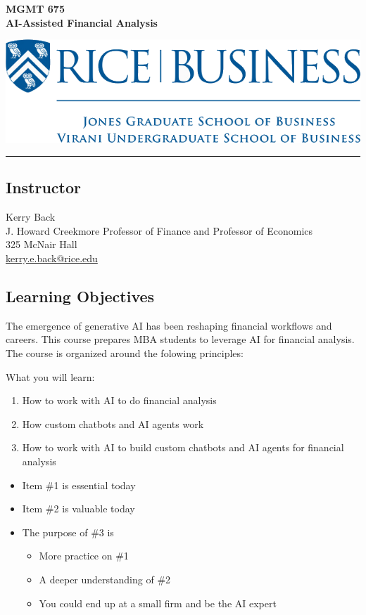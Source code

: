 \documentclass[11pt]{article}
\begin{document}
\begin{minipage}[c][3cm][c]{0.5\textwidth}
\Large\textbf{MGMT 675\\ AI-Assisted Financial Analysis}
\end{minipage}
\hfill
\begin{minipage}[c][3cm][c]{0.4\textwidth}
\includegraphics[width=\textwidth]{rice-business-transparent-final.png}
\end{minipage}

\vspace{0.5cm}
\hrule

\subsection*{Instructor}
Kerry Back\\
J. Howard Creekmore Professor of Finance and Professor of Economics\\
325 McNair Hall\\
\href{mailto:kerry.e.back@rice.edu}{kerry.e.back@rice.edu}

\subsection*{Learning Objectives}

The emergence of generative AI has been reshaping financial workflows and careers. This course prepares MBA students to leverage AI for financial analysis.  The course is organized around the folowing principles:

What you will learn:
\begin{enumerate}
\item How to work with AI to do financial analysis
\item How custom chatbots and AI agents work 
\item How to work with AI to build custom chatbots and AI agents for financial analysis
\end{enumerate}

\begin{itemize}
\item Item \#1 is essential today 
\item Item \#2 is valuable today
\item The purpose of  \#3 is
\begin{itemize}
\item More practice on  \#1
\item A deeper understanding of  \#2
\item You could end up at a small firm and be the AI expert
\end{itemize}
\end{itemize}
\end{document}
